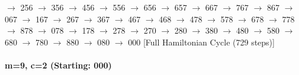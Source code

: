 $\rightarrow$ 256 $\rightarrow$ 356 $\rightarrow$ 456 $\rightarrow$ 556 $\rightarrow$ 656 $\rightarrow$ 657 $\rightarrow$ 667 $\rightarrow$ 767 $\rightarrow$ 867 $\rightarrow$ 067 $\rightarrow$ 167 $\rightarrow$ 267 $\rightarrow$ 367 $\rightarrow$ 467 $\rightarrow$ 468 $\rightarrow$ 478 $\rightarrow$ 578 $\rightarrow$ 678 $\rightarrow$ 778 $\rightarrow$ 878 $\rightarrow$ 078 $\rightarrow$ 178 $\rightarrow$ 278 $\rightarrow$ 270 $\rightarrow$ 280 $\rightarrow$ 380 $\rightarrow$ 480 $\rightarrow$ 580 $\rightarrow$ 680 $\rightarrow$ 780 $\rightarrow$ 880 $\rightarrow$ 080 $\rightarrow$ 000 
[Full Hamiltonian Cycle (729 steps)]


\paragraph{ m=9, c=2 (Starting: 000)}



